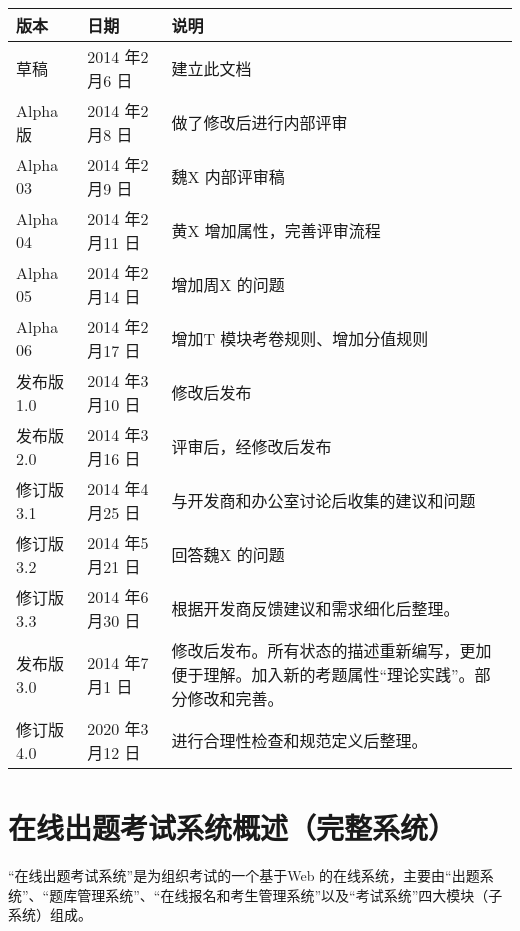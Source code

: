 \documentclass[hyperref, a4paper]{ctexart}
\begin{document}
\begin{center}
\begin{tabular}{|p{2cm}|p{3.3cm}|p{8cm}|}
\hline
版本 & 日期 & 说明\\
\hline
草稿 & 2014 年2 月6 日 & 建立此文档\\
\hline
Alpha 版 & 2014 年2 月8 日 & 做了修改后进行内部评审\\
\hline
Alpha 03 & 2014 年2 月9 日 & 魏X 内部评审稿\\
\hline
Alpha 04 & 2014 年2 月11 日 & 黄X 增加属性，完善评审流程\\
\hline
Alpha 05 & 2014 年2 月14 日 & 增加周X 的问题\\
\hline
Alpha 06 & 2014 年2 月17 日 & 增加T 模块考卷规则、增加分值规则\\
\hline
发布版 1.0 & 2014 年3 月10 日 & 修改后发布\\
\hline
发布版 2.0 & 2014 年3 月16 日 & 评审后，经修改后发布\\
\hline
修订版3.1 & 2014 年4 月25 日 & 与开发商和办公室讨论后收集的建议和问题\\
\hline
修订版3.2 & 2014 年5 月21 日 & 回答魏X 的问题\\
\hline
修订版3.3 & 2014 年6 月30 日 & 根据开发商反馈建议和需求细化后整理。\\
\hline
发布版3.0 & 2014 年7 月1 日 & 修改后发布。所有状态的描述重新编写，更加便于理解。加入新的考题属性“理论实践”。部分修改和完善。\\
\hline
修订版4.0 & 2020 年3 月12 日 & 进行合理性检查和规范定义后整理。\\
\hline
\end{tabular}
\end{center}

\normalsize

\newpage

\tableofcontents

\newpage

\hypertarget{ux5728ux7ebfux51faux9898ux8003ux8bd5ux7cfbux7edfux6982ux8ff0ux5b8cux6574ux7cfbux7edf}{%
\section*{在线出题考试系统概述（完整系统）}\label{ux5728ux7ebfux51faux9898ux8003ux8bd5ux7cfbux7edfux6982ux8ff0ux5b8cux6574ux7cfbux7edf}}

``在线出题考试系统''是为组织考试的一个基于Web
的在线系统，主要由``出题系统''、``题库管理系统''、``在线报名和考生管理系统''以及``考试系统''四大模块（子系统）组成。
\end{document}
